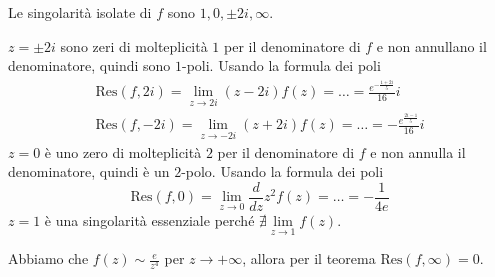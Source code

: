 Le singolarità isolate di $f$ sono $1,0,\pm 2i,\infty $.

$z=\pm 2i$ sono zeri di molteplicità $1$ per il denominatore di $f$ e non annullano il denominatore, quindi sono $1$-poli. Usando la formula dei poli
\begin{gather*}
\mathrm{Res}\left( f,2i\right) =\lim\limits _{z\rightarrow 2i}\left( z-2i\right) f\left( z\right) =\dotsc =\frac{e^{-\frac{1+2i}{5}}}{16} i\\
\mathrm{Res}\left( f,-2i\right) =\lim\limits _{z\rightarrow -2i}\left( z+2i\right) f\left( z\right) =\dotsc =-\frac{e^{\frac{2i-1}{5}}}{16} i
\end{gather*}
$z=0$ è uno zero di molteplicità $2$ per il denominatore di $f$ e non annulla il denominatore, quindi è un $2$-polo. Usando la formula dei poli
\begin{equation*}
\mathrm{Res}\left( f,0\right) =\lim\limits _{z\rightarrow 0}\frac{d}{dz} z^{2} f\left( z\right) =\dotsc =-\frac{1}{4e}
\end{equation*}
$z=1$ è una singolarità essenziale perché $\nexists \lim\limits _{z\rightarrow 1} f\left( z\right)$.

Abbiamo che $f\left( z\right) \sim \frac{e}{z^{4}}$ per $z\rightarrow +\infty $, allora per il teorema $\mathrm{Res}\left( f,\infty \right) =0$.

